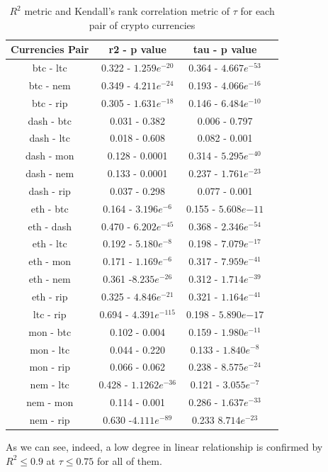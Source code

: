 \documentclass[12pt,twoside]{article}
\newcommand{\head}[1]{\textnormal{\textbf{#1}}}
\begin{document}
\begin{table}[H]
\begin{tabular}{cccc}
\hline
\head{Currencies Pair} & \head{r2 - p value} & \head{tau - p value} \\
\hline
btc - ltc & 0.322 - $1.259e^{-20}$ & 0.364 - $4.667e^{-53}$\\
btc - nem & 0.349 - $4.211e^{-24}$ & 0.193 - $4.066e^{-16}$\\
btc - rip & 0.305 - $1.631e^{-18}$ & 0.146 - $6.484e^{-10}$\\
dash - btc & 0.031 - 0.382 & 0.006 - 0.797\\
dash - ltc & 0.018 - 0.608 & 0.082 - 0.001\\
dash - mon & 0.128 - 0.0001 & 0.314 - $5.295e^{-40}$\\
dash - nem & 0.133 - 0.0001 & 0.237 - $1.761e^{-23}$\\
dash - rip & 0.037 - 0.298 & 0.077 - 0.001\\
eth - btc & 0.164 - $3.196e^{-6}$ & 0.155 - $5.608e{-11}$\\
eth - dash & 0.470 - $6.202e^{-45}$ & 0.368 - $2.346e^{-54}$\\
eth - ltc & 0.192 - $5.180e^{-8}$ & 0.198 - $7.079e^{-17}$\\
eth - mon & 0.171 - $1.169e^{-6}$ & 0.317 - $7.959e^{-41}$\\
eth - nem & 0.361 -$8.235e^{-26}$ & 0.312 - $1.714e^{-39}$\\
eth - rip & 0.325 - $4.846e^{-21}$ & 0.321 - $1.164e^{-41}$\\
ltc - rip & 0.694 - $4.391e^{-115}$ & 0.198 - $5.890e{-17}$\\
mon - btc & 0.102 - 0.004 & 0.159 - $1.980e^{-11}$\\
mon - ltc & 0.044 - 0.220 & 0.133 - $1.840e^{-8}$\\
mon - rip & 0.066 - 0.062 & 0.238 - $8.575e^{-24}$\\
nem - ltc & 0.428 - $1.1262e^{-36}$ & 0.121 - $3.055e^{-7}$\\
nem - mon & 0.114 - 0.001  & 0.286 - $1.637e^{-33}$\\
nem - rip & 0.630 -$4.111e^{-89}$ & 0.233 $8.714e^{-23}$\\
\hline
\end{tabular}
\caption{$R^2$  metric and Kendall's rank correlation metric of $\tau$ for each pair of crypto currencies}
\end{table}


\bigbreak
As we can see, indeed, a low degree in linear relationship is confirmed by $R^2 \leq 0.9$ at $\tau \leq 0.75$ for all of them.
\bigbreak
\end{document}
